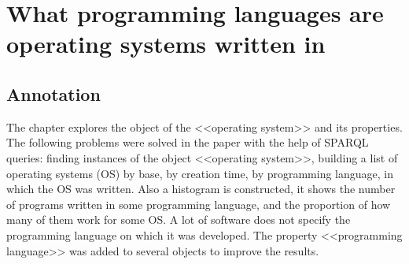 \setchapterpreamble[u]{\margintoc}
\chapter{What programming languages are operating systems written in}

\section{Annotation}
The chapter explores the object of the <<operating system>> and its properties. The following problems were solved in the paper with the help of SPARQL queries: finding instances of the object <<operating system>>, building a list of operating systems (OS) by base, by creation time, by programming language, in which the OS was written. Also a histogram is constructed, it shows the number of programs written in some programming language, and the proportion of how many of them work for some OS. A lot of software does not specify the programming language on which it was developed. The property <<programming language>> was added to several objects to improve the results.
